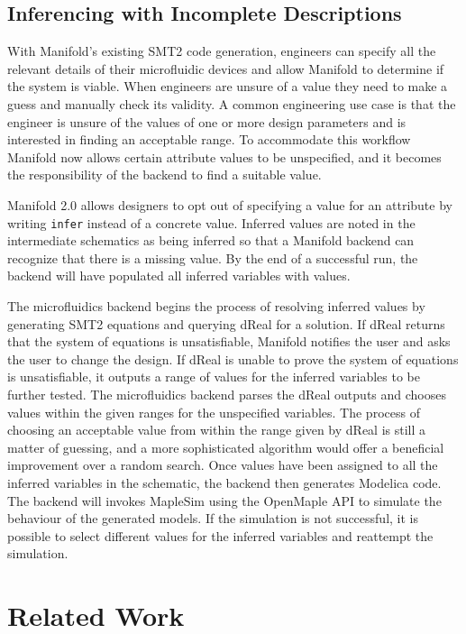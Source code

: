 \subsection{Inferencing with Incomplete Descriptions}

With Manifold's existing SMT2 code generation, engineers can specify all the
relevant details of their microfluidic devices and allow Manifold to determine if the system is viable. When engineers
are unsure of a value they need to make a guess and manually check its
validity. A common engineering use case is that the engineer is unsure of the
values of one or more design parameters and is interested in finding an
acceptable range. To accommodate this workflow Manifold now allows certain
attribute values to be unspecified, and it becomes the
responsibility of the backend to find a suitable value.

Manifold 2.0 allows designers to opt out of
specifying a value for an attribute by writing {\tt infer} instead of a
concrete value. Inferred values are noted in the intermediate schematics as
being inferred so that a Manifold backend can recognize that there is a missing value.
By the end of a successful run, the backend will have populated all inferred variables with values.

The microfluidics backend begins the process of resolving inferred values by generating SMT2 equations
and querying dReal for a solution.
If dReal returns that the system of equations is unsatisfiable, Manifold notifies the
user and asks the user to change the design. If dReal is unable to prove the system of equations is unsatisfiable,
it outputs a range of values for the inferred variables to be further tested.
The microfluidics backend parses the dReal outputs and chooses values within the given ranges for the
unspecified variables.
The process of choosing an acceptable value from within the range given by dReal is still a matter of
guessing, and a more sophisticated algorithm would offer a beneficial improvement over a random search.
Once values have been assigned to all the inferred variables in the schematic, the backend then generates Modelica code.
The backend will invokes MapleSim using the OpenMaple API to simulate the behaviour of the generated models.
If the simulation is not successful, it is possible to select different values for the inferred variables
and reattempt the simulation.

\section{Related Work}

